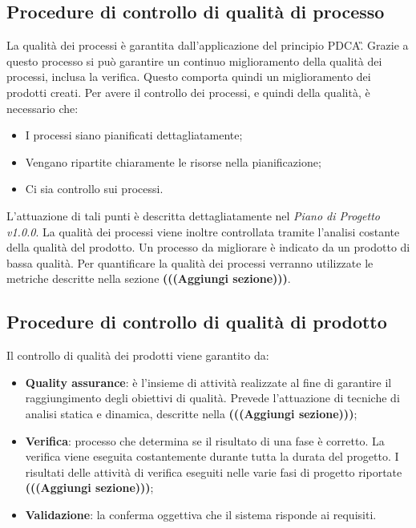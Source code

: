 \subsection{Procedure di controllo di qualità di processo}
La qualità dei processi è garantita dall'applicazione del principio PDCA\G. 
Grazie a questo processo si può garantire un continuo miglioramento della 
qualità dei processi, inclusa la verifica. Questo comporta quindi un 
miglioramento dei prodotti creati.\newline \newline
Per avere il controllo dei processi, e quindi della qualità, è necessario che:
\begin{itemize}
	\item	I processi siano pianificati dettagliatamente;
	\item	Vengano ripartite chiaramente le risorse nella pianificazione;
	\item	Ci sia controllo sui processi.
\end{itemize}
L'attuazione di tali punti è descritta dettagliatamente nel \textit{Piano di 
Progetto v1.0.0}. \newline
La qualità dei processi viene inoltre controllata tramite l'analisi costante della qualità del prodotto. Un processo da migliorare è indicato da un prodotto di bassa qualità. \newline
Per quantificare la qualità dei processi verranno utilizzate le metriche 
descritte nella sezione \textbf{(((Aggiungi sezione)))}.

\subsection{Procedure di controllo di qualità di prodotto}
Il controllo di qualità dei prodotti viene garantito da:
\begin{itemize}
	\item \textbf{Quality assurance}: è l'insieme di attività realizzate al 
	fine di garantire il raggiungimento degli obiettivi di qualità. Prevede 
	l'attuazione di tecniche di analisi statica e dinamica, descritte nella 
	\textbf{(((Aggiungi sezione)))};
	\item \textbf{Verifica}: processo che determina se il risultato di una fase 
	è corretto. La verifica viene eseguita costantemente durante 
	tutta la durata del progetto. I risultati delle attività di verifica 
	eseguiti nelle varie fasi di progetto riportate \textbf{(((Aggiungi 
	sezione)))};
	\item \textbf{Validazione}: la conferma oggettiva che il sistema risponde ai requisiti.
\end{itemize}


